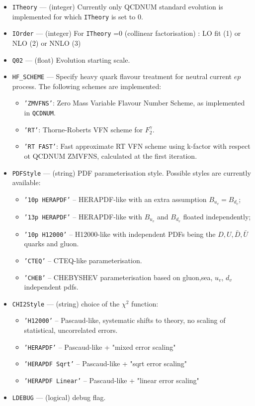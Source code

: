 \documentclass[11pt,a4paper]{article}
\begin{document}
\label{sec:herafitter}
\begin{itemize}
  \item {\tt ITheory} --- (integer) Currently only QCDNUM standard evolution
     is implemented for which {\tt ITheory} is set to 0.
  \item {\tt IOrder} --- (integer) For {\tt ITheory} =0 (collinear factorisation) : 
        LO fit (1) or NLO (2) or NNLO (3) 
  \item {\tt Q02} --- (float) Evolution starting scale.
  \item {\tt HF\_SCHEME} --- Specify heavy quark flavour treatment for neutral
 current $ep$ process. The following schemes are implemented: 
    \begin{itemize}
      \item {\tt 'ZMVFNS'}: Zero Mass Variable Flavour Number Scheme, as implemented
 in {\tt QCDNUM}.
      \item {\tt 'RT'}: Thorne-Roberts VFN scheme for $F_2^{\gamma}$. 
      \item {\tt 'RT FAST'}: Fast approximate RT VFN scheme using k-factor 
with respect ot QCDNUM ZMVFNS, calculated at the first iteration.
    \end{itemize}
\item {\tt PDFStyle} --- (string) PDF parameterisation style. Possible styles are currently available:
   \begin{itemize}
  \item{\tt '10p HERAPDF'} -- HERAPDF-like with an extra assumption 
                                 $B_{u_v} = B_{d_v}$;
  \item{\tt '13p HERAPDF'} -- HERAPDF-like with $B_{u_v}$ and $B_{d_v}$ 
                          floated independently;
  \item{\tt '10p H12000'}  -- H12000-like with independent PDFs being the
               $D,U,\bar{D},\bar{U}$ quarks and gluon.
  \item{\tt 'CTEQ'}        -- CTEQ-like parameterisation.
  \item{\tt 'CHEB'}        -- CHEBYSHEV parameterisation based on 
         gluon,sea, $u_{v}$, $d_{v}$ independent pdfs.
 \end{itemize}
\item {\tt CHI2Style}  --- (string) choice of the $\chi^2$ function:
   \begin{itemize}
   \item {\tt 'H12000'} -- Pascaud-like, systematic shifts to theory, no scaling of statistical, uncorrelated errors.
   \item {\tt 'HERAPDF'} -- Pascaud-like + "mixed error scaling"
   \item {\tt 'HERAPDF Sqrt'}   -- Pascaud-like + "sqrt error scaling"
   \item {\tt 'HERAPDF Linear'} -- Pascaud-like + "linear error scaling"
 \end{itemize}
  \item {\tt LDEBUG}  --- (logical) debug flag.
\end{itemize}
\end{document}
